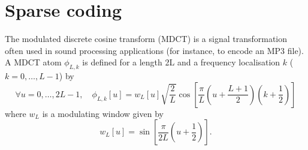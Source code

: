 \documentclass[11pt]{article}
\begin{document}
\newpage
\section{Sparse coding}

The modulated discrete cosine transform (MDCT) is a signal transformation often used in sound processing applications (for instance, to encode an MP3 file).
A MDCT atom $\phi_{L,k}$ is defined for a length 2L and a frequency localisation $k$ ($k=0,\dots,L-1$) by
\begin{equation}
\forall u=0,\dots,2L-1,\quad\phi_{L,k}[u]=w_{L}[u]\sqrt{\frac{2}{L}} \cos [ \frac{\pi}{L} \left(u+ \frac{L+1}{2}\right) (k+\frac{1}{2}) ]
\end{equation}
where $w_{L}$ is a modulating window given by
\begin{equation}
w_L[u] = \sin \left[{\frac {\pi }{2L}}\left(u+{\frac {1}{2}}\right)\right].
\end{equation}
\end{document}
